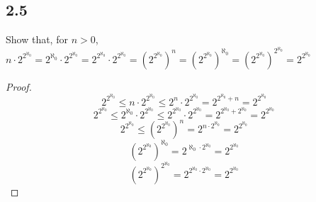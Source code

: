 \subsection*{2.5} Show that, for $n> 0$, $n \cdot 2^{2^{\aleph_0}} = 2^{{\aleph_0}} \cdot 2^{2^{\aleph_0}} = 2^{2^{\aleph_0}} \cdot 2^{2^{\aleph_0}} = (2^{2^{\aleph_0}})^n = (2^{2^{\aleph_0}})^{\aleph_0} = (2^{2^{\aleph_0}})^{2^{\aleph_0}} = 2^{2^{\aleph_0}}$


\begin{proof}
    $$2^{2^{\aleph_0}} \leq n \cdot 2^{2^{\aleph_0}} \leq 2^{n}  \cdot 2^{2^{\aleph_0}} = 2^{2^{\aleph_0}+ n} = 2^{2^{\aleph_0}}$$
    $$2^{2^{\aleph_0}} \leq 2^{{\aleph_0}} \cdot 2^{2^{\aleph_0}} \leq 2^{2^{\aleph_0}} \cdot 2^{2^{\aleph_0}} = 2^{2^{\aleph_0}+2^{\aleph_0}} = 2^{2^{\aleph_0}} $$
    $$2^{2^{\aleph_0}} \leq (2^{2^{\aleph_0}})^n = 2^{n\cdot 2^{\aleph_0}} = 2^{2^{\aleph_0}}$$
    $$(2^{2^{\aleph_0}})^{\aleph_0} = 2^{\aleph_0 \cdot 2^{\aleph_0}} = 2^{2^{\aleph_0}} $$
    $$(2^{2^{\aleph_0}})^{2^{\aleph_0}} = 2^{2^{\aleph_0} \cdot 2^{\aleph_0}} = 2^{2^{\aleph_0}}$$
\end{proof}

